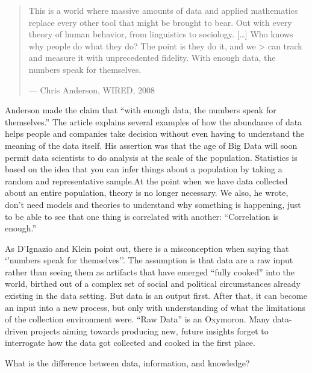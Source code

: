 \documentclass[
]{book}
\begin{document}
\begin{quote}
This is a world where massive amounts of data and applied mathematics replace every other tool that might be brought to bear. Out with
every theory of human behavior, from linguistics to sociology. {[}\ldots{]} Who knows why people do what they do? The point is they do it, and we \textgreater{} can track and measure it with unprecedented fidelity. With enough data, the numbers speak for themselves.

--- Chris Anderson, WIRED, 2008
\end{quote}

Anderson made the claim that ``with enough data, the numbers speak for themselves.'' The article explains several examples of how the abundance of data helps people and companies take decision without even having to understand the meaning of the data itself. His assertion was that the age of Big Data will soon permit data scientists to do analysis at the scale of the population. Statistics is based on the idea that you can infer things about a population by taking a random and representative sample.At the point when we have data collected about an entire population, theory is no longer necessary. We also, he wrote, don't need models and theories to understand why something is happening, just to be able to see that one thing is correlated with another: ``Correlation is enough.''

As D'Ignazio and Klein \citep{dignazio2020datafeminism} point out, there is a misconception when saying that `'numbers speak for themselves''. The assumption is that data are a raw input rather than seeing them as artifacts that have emerged ``fully cooked'' into the world, birthed out of a complex set of social and political circumstances already existing in the data setting. But data is an output first. After that, it can become an input into a new process, but only with understanding of what the limitations of the collection environment were. ``Raw Data'' is an Oxymoron. Many data-driven projects aiming towards producing new, future insights forget to interrogate how the data got collected and cooked in the first place.

What is the difference between data, information, and knowledge?
\end{document}
